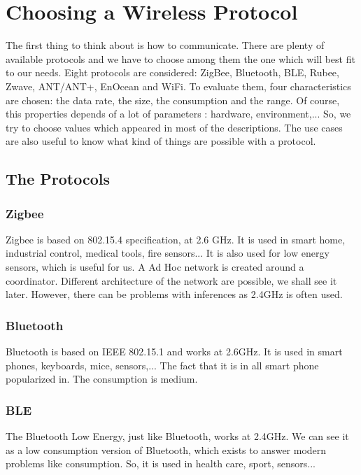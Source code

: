 \section{Choosing a Wireless Protocol}
\label{s:Choosing a Wireless Protocol}

The first thing to think about is how to communicate. There are plenty of available protocols and we have to choose among them the one which will best fit to our needs. Eight protocols are considered: ZigBee, Bluetooth, BLE, Rubee, Zwave, ANT/ANT+, EnOcean and WiFi. To evaluate them, four characteristics are chosen: the data rate, the size, the consumption and the range. Of course, this properties depends of a lot of parameters : hardware, environment,... So, we try to choose values which appeared in most of the descriptions. The use cases are also useful to know what kind of things are possible with a protocol.

\subsection{The Protocols}
\subsubsection{Zigbee}

Zigbee is based on 802.15.4 specification, at 2.6 GHz. It is used in smart home, industrial control, medical tools, fire sensors... It is also used for low energy sensors, which is useful for us. A Ad Hoc network is created around a coordinator. Different architecture of the network are possible, we shall see it later. However, there can be problems with inferences as 2.4GHz is often used.

\subsubsection{Bluetooth}

Bluetooth is based on IEEE 802.15.1 and works at 2.6GHz. It is used in smart phones, keyboards, mice, sensors,... The fact that it is in all smart phone popularized in. The consumption is medium.

\subsubsection{BLE}

The Bluetooth Low Energy, just like Bluetooth, works at 2.4GHz. We can see it as a low consumption version of Bluetooth, which exists to answer modern problems like consumption. So, it is used in health care, sport, sensors...

